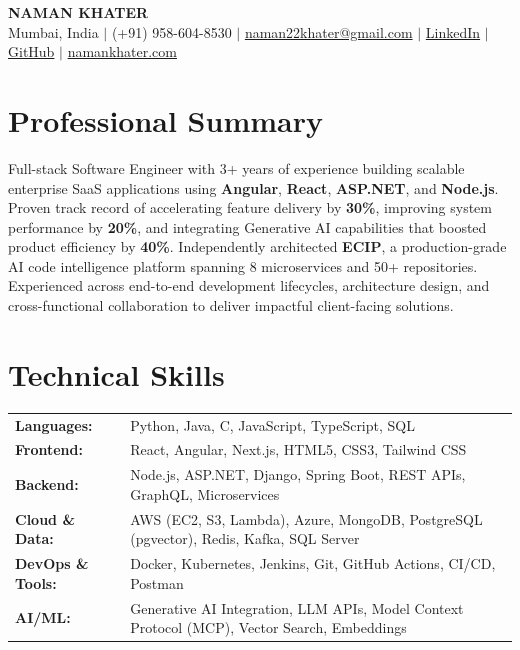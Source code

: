 \documentclass[letterpaper,10pt]{article}
\begin{document}
\begin{center}
  {\LARGE\bfseries NAMAN KHATER}\\[3pt]
  \small Mumbai, India $\vert$ (+91) 958-604-8530 $\vert$
  \href{mailto:naman22khater@gmail.com}{naman22khater@gmail.com} $\vert$
  \href{https://www.linkedin.com/in/naman-22-khater/}{LinkedIn} $\vert$
  \href{https://github.com/MadMaxINDIAN}{GitHub} $\vert$
  \href{https://namankhater.com}{namankhater.com}
\end{center}

\section{Professional Summary}
Full-stack Software Engineer with 3+ years of experience building scalable enterprise SaaS applications using \textbf{Angular}, \textbf{React}, \textbf{ASP.NET}, and \textbf{Node.js}. Proven track record of accelerating feature delivery by \textbf{30\%}, improving system performance by \textbf{20\%}, and integrating Generative AI capabilities that boosted product efficiency by \textbf{40\%}. Independently architected \textbf{ECIP}, a production-grade AI code intelligence platform spanning 8 microservices and 50+ repositories. Experienced across end-to-end development lifecycles, architecture design, and cross-functional collaboration to deliver impactful client-facing solutions.

\section{Technical Skills}
\begin{tabularx}{\textwidth}{@{}l X@{}}
\textbf{Languages:} & Python, Java, C, JavaScript, TypeScript, SQL \\
\textbf{Frontend:} & React, Angular, Next.js, HTML5, CSS3, Tailwind CSS \\
\textbf{Backend:} & Node.js, ASP.NET, Django, Spring Boot, REST APIs, GraphQL, Microservices \\
\textbf{Cloud \& Data:} & AWS (EC2, S3, Lambda), Azure, MongoDB, PostgreSQL (pgvector), Redis, Kafka, SQL Server \\
\textbf{DevOps \& Tools:} & Docker, Kubernetes, Jenkins, Git, GitHub Actions, CI/CD, Postman \\
\textbf{AI/ML:} & Generative AI Integration, LLM APIs, Model Context Protocol (MCP), Vector Search, Embeddings \\
\end{tabularx}
\end{document}
